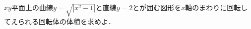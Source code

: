 \documentclass[../../main.tex]{subfiles}
\begin{document}
$xy$平面上の曲線$y=\sqrt{|x^2-1|}$と直線$y=2$とが囲む図形を$x$軸のまわりに回転してえられる回転体の体積を求めよ．
\end{document}
